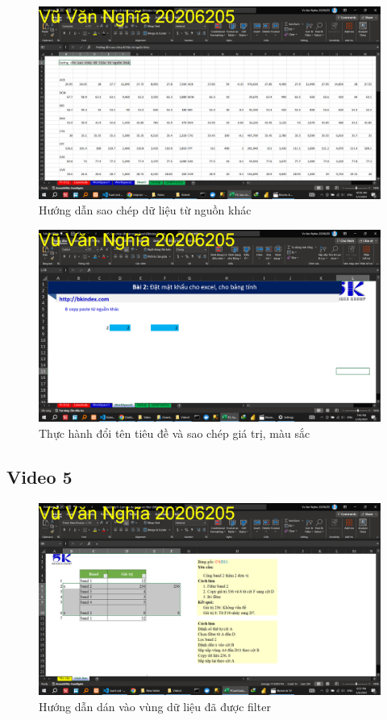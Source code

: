\documentclass{article}
\begin{document}
\begin{figure}[H]
\centering
\includegraphics[scale = 0.15]{Video4/HuongDan/6.png}
\caption{Hướng dẫn sao chép dữ liệu từ nguồn khác}
\end{figure}
\begin{figure}[H]
\centering
\includegraphics[scale = 0.15]{Video4/ThucHanh/1.png}
\caption{Thực hành đổi tên tiêu đề và sao chép giá trị, màu sắc}
\end{figure}
\subsection{Video 5}
\begin{figure}[H]
\centering
\includegraphics[scale = 0.15]{Video5/HuongDan/0.png}
\caption{Hướng dẫn dán vào vùng dữ liệu đã được filter}
\end{figure}
\end{document}
